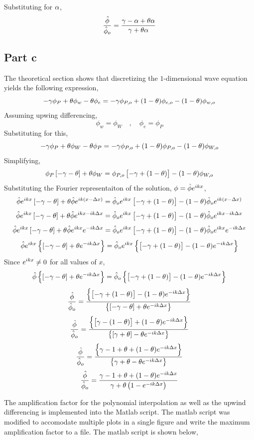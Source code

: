 \documentclass[class=report, 12pt, crop=false]{standalone}
\begin{document}
\begin{center}
Substituting for $\alpha$,
$$\frac{\hat{\phi}}{\hat{\phi}_o} = \frac{\gamma - \alpha + \theta\alpha}{\gamma + \theta\alpha}$$


\subsection{Part c}
The theoretical section shows that discretizing the $1$-dimensional wave equation yields the following expression,
$$-\gamma\phi_{P} + \theta\phi_{w} - \theta\phi_{e} = - \gamma\phi_{P,o} + (1-\theta)\phi_{e,o} - (1-\theta)\phi_{w,o}$$
Assuming upwing differencing,
$$\phi_{w} = \phi_{W} \quad,\quad \phi_{e} = \phi_{P}$$
Substituting for this,
$$-\gamma\phi_{P} + \theta\phi_{W} - \theta\phi_{P} = - \gamma\phi_{P,o} + (1-\theta)\phi_{P,o} - (1-\theta)\phi_{W,o}$$
Simplifying,
$$\phi_{P}\left[-\gamma - \theta\right] + \theta\phi_{W} = \phi_{P,o}\left[-\gamma + (1-\theta)\right] - (1-\theta)\phi_{W,o}$$
Substituting the Fourier representaiton of the solution, $\phi = \hat{\phi}e^{ikx}$,
$$\hat{\phi}e^{ikx}\left[-\gamma - \theta\right] + \theta\hat{\phi}e^{ik(x-\Delta x)} = \hat{\phi}_{o}e^{ikx}\left[-\gamma + (1-\theta)\right] - (1-\theta)\hat{\phi}_{o}e^{ik(x-\Delta x)}$$
$$\hat{\phi}e^{ikx}\left[-\gamma - \theta\right] + \theta\hat{\phi}e^{ikx-ik\Delta x} = \hat{\phi}_{o}e^{ikx}\left[-\gamma + (1-\theta)\right] - (1-\theta)\hat{\phi}_{o}e^{ikx-ik\Delta x}$$
$$\hat{\phi}e^{ikx}\left[-\gamma - \theta\right] + \theta\hat{\phi}e^{ikx}e^{-ik\Delta x} = \hat{\phi}_{o}e^{ikx}\left[-\gamma + (1-\theta)\right] - (1-\theta)\hat{\phi}_{o}e^{ikx}e^{-ik\Delta x}$$
$$\hat{\phi}e^{ikx}\left\{\left[-\gamma - \theta\right] + \theta e^{-ik\Delta x}\right\} = \hat{\phi}_{o}e^{ikx}\left\{\left[-\gamma + (1-\theta)\right] - (1-\theta)e^{-ik\Delta x}\right\}$$
Since $\displaystyle{e^{ikx} \neq 0}$ for all values of $x$,
$$\hat{\phi}\left\{\left[-\gamma - \theta\right] + \theta e^{-ik\Delta x}\right\} = \hat{\phi}_{o}\left\{\left[-\gamma + (1-\theta)\right] - (1-\theta)e^{-ik\Delta x}\right\}$$
$$\frac{\hat{\phi}}{\hat{\phi}_{o}} = \frac{\left\{\left[-\gamma + (1-\theta)\right] - (1-\theta)e^{-ik\Delta x}\right\}}{\left\{\left[-\gamma - \theta\right] + \theta e^{-ik\Delta x}\right\}}$$
$$\frac{\hat{\phi}}{\hat{\phi}_{o}} = \frac{\left\{\left[\gamma - (1-\theta)\right] + (1-\theta)e^{-ik\Delta x}\right\}}{\left\{\left[\gamma + \theta\right] - \theta e^{-ik\Delta x}\right\}}$$
$$\frac{\hat{\phi}}{\hat{\phi}_{o}} = \frac{\left\{\gamma - 1 + \theta + (1-\theta)e^{-ik\Delta x}\right\}}{\left\{\gamma + \theta - \theta e^{-ik\Delta x}\right\}}$$
$$\frac{\hat{\phi}}{\hat{\phi}_{o}} = \frac{\gamma - 1 + \theta + (1-\theta)e^{-ik\Delta x}}{\gamma + \theta\left(1 - e^{-ik\Delta x}\right)}$$

The amplification factor for the polynomial interpolation as well as the upwind differencing is implemented into the Matlab script. The matlab script was modified to accomodate multiple plots in a single figure and write the maximum amplification factor to a file. The matlab script is shown below,



\end{center}
\end{document}

